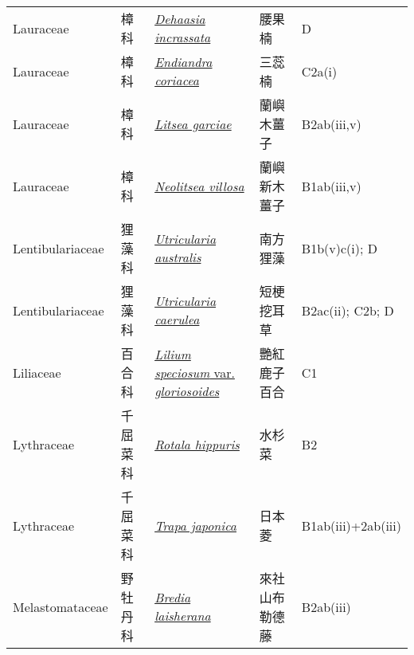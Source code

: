 {\begin{longtable}{p{2.5cm}p{2cm}p{5cm}p{2.5cm}p{3cm}}
    Lauraceae & 樟科 & \href{http://www.theplantlist.org/tpl1.1/search?q=Dehaasia+incrassata}{\textit{Dehaasia incrassata} } & 腰果楠 & D \index{Dehaasia@\textit{Dehaasia}!incrassata@\textit{incrassata}}  \index{腰果楠} \\
    Lauraceae & 樟科 & \href{http://www.theplantlist.org/tpl1.1/search?q=Endiandra+coriacea}{\textit{Endiandra coriacea} } & 三蕊楠 & C2a(i) \index{Endiandra@\textit{Endiandra}!coriacea@\textit{coriacea}}  \index{三蕊楠} \\
    Lauraceae & 樟科 & \href{http://www.theplantlist.org/tpl1.1/search?q=Litsea+garciae}{\textit{Litsea garciae} } & 蘭嶼木薑子 & B2ab(iii,v) \index{Litsea@\textit{Litsea}!garciae@\textit{garciae}}  \index{蘭嶼木薑子} \\
    Lauraceae & 樟科 & \href{http://www.theplantlist.org/tpl1.1/search?q=Neolitsea+villosa}{\textit{Neolitsea villosa} } & 蘭嶼新木薑子 & B1ab(iii,v) \index{Neolitsea@\textit{Neolitsea}!villosa@\textit{villosa}}  \index{蘭嶼新木薑子} \\
    Lentibulariaceae & 狸藻科 & \href{http://www.theplantlist.org/tpl1.1/search?q=Utricularia+australis}{\textit{Utricularia australis} } & 南方狸藻 & B1b(v)c(i); D \index{Utricularia@\textit{Utricularia}!australis@\textit{australis}}  \index{南方狸藻} \\
    Lentibulariaceae & 狸藻科 & \href{http://www.theplantlist.org/tpl1.1/search?q=Utricularia+caerulea}{\textit{Utricularia caerulea} } & 短梗挖耳草 & B2ac(ii); C2b; D \index{Utricularia@\textit{Utricularia}!caerulea@\textit{caerulea}}  \index{短梗挖耳草} \\
    Liliaceae & 百合科 & \href{http://www.theplantlist.org/tpl1.1/search?q=Lilium+speciosum+var.+gloriosoides}{\textit{Lilium speciosum} var. \textit{gloriosoides} } & 艷紅鹿子百合 & C1 \index{Lilium@\textit{Lilium}!speciosum@\textit{speciosum}!var. gloriosoides@var. \textit{gloriosoides}}  \index{艷紅鹿子百合} \\
    Lythraceae & 千屈菜科 & \href{http://www.theplantlist.org/tpl1.1/search?q=Rotala+hippuris}{\textit{Rotala hippuris} } & 水杉菜 & B2 \index{Rotala@\textit{Rotala}!hippuris@\textit{hippuris}}  \index{水杉菜} \\
    Lythraceae & 千屈菜科 & \href{http://www.theplantlist.org/tpl1.1/search?q=Trapa+japonica}{\textit{Trapa japonica} } & 日本菱 & B1ab(iii)+2ab(iii) \index{Trapa@\textit{Trapa}!japonica@\textit{japonica}}  \index{日本菱} \\
    Melastomataceae & 野牡丹科 & \href{http://www.theplantlist.org/tpl1.1/search?q=Bredia+laisherana}{\textit{Bredia laisherana} } & 來社山布勒德藤 & B2ab(iii) \index{Bredia@\textit{Bredia}!laisherana@\textit{laisherana}}  \index{來社山布勒德藤} \\

\end{longtable}}
